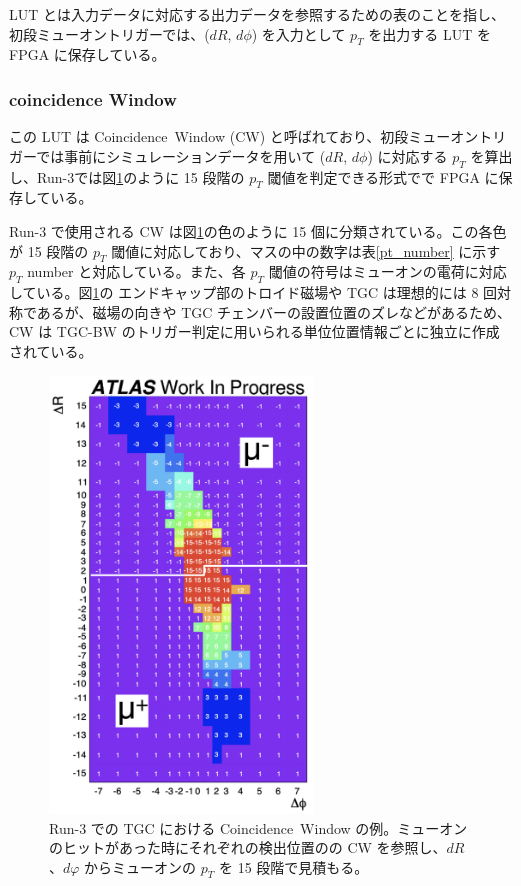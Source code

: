 LUT とは入力データに対応する出力データを参照するための表のことを指し、初段ミューオントリガーでは、($dR$, $d\phi$) を入力として $p_T$ を出力する LUT を FPGA に保存している。

\subsubsection{coincidence Window}
この LUT は Coincidence~Window (CW) と呼ばれており、初段ミューオントリガーでは事前にシミュレーションデータを用いて ($dR$, $d\phi$) に対応する $p_T$ を算出し、Run-3では図\ref{fig:CW}のように 15 段階の $p_T$ 閾値を判定できる形式でで FPGA に保存している。

Run-3 で使用される CW は図\ref{fig:CW}の色のように 15 個に分類されている。この各色が 15 段階の $p_T$ 閾値に対応しており、マスの中の数字は表\ref{pt_number} に示す $p_T$ number と対応している。また、各 $p_T$ 閾値の符号はミューオンの電荷に対応している。図\ref{fig:CW}の
エンドキャップ部のトロイド磁場や TGC は理想的には 8 回対称であるが、磁場の向きや TGC チェンバーの設置位置のズレなどがあるため、CW は TGC-BW のトリガー判定に用いられる単位位置情報ごとに独立に作成されている。


\begin{figure}[tb]
  \centering
  \includegraphics[clip, width=7cm]{fig/3/cw_run3_shiomi.png}
  \caption{Run-3 での TGC における Coincidence~Window の例。ミューオンのヒットがあった時にそれぞれの検出位置のの CW を参照し、$dR$、$dφ$ からミューオンの $p_T$ を 15 段階で見積もる。}
  \label{fig:CW}
\end{figure}

